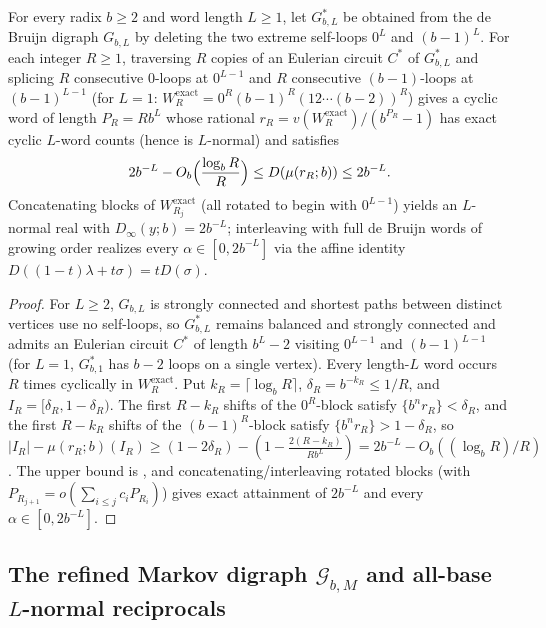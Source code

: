 \documentclass[11pt]{article}
\newcommand{\fr}[1]{\{#1\}}
\begin{document}
\begin{theorem}[Sharp ceiling $D_{\max}(b,L)=2b^{-L}$ and periodic-seed attainment]\label{thm:Dmax-attain}
For every radix $b\ge2$ and word length $L\ge1$, let $G_{b,L}^*$ be obtained from the de Bruijn digraph $G_{b,L}$ by deleting the two extreme self-loops $0^L$ and $(b-1)^L$. For each integer $R\ge1$, traversing $R$ copies of an Eulerian circuit $C^*$ of $G_{b,L}^*$ and splicing $R$ consecutive $0$-loops at $0^{L-1}$ and $R$ consecutive $(b-1)$-loops at $(b-1)^{L-1}$ (for $L=1$: $W_R^{\mathrm{exact}}=0^R(b-1)^R(12\cdots(b-2))^R$) gives a cyclic word of length $P_R=Rb^L$ whose rational $r_R=v(W_R^{\mathrm{exact}})/(b^{P_R}-1)$ has exact cyclic $L$-word counts (hence is $L$-normal) and satisfies
\[
2b^{-L}-O_b\Bigl(\frac{\log_b R}{R}\Bigr)\le D(\mu(r_R;b))\le 2b^{-L}.
\]
Concatenating blocks of $W_{R_j}^{\mathrm{exact}}$ (all rotated to begin with $0^{L-1}$) yields an $L$-normal real with $D_\infty(y;b)=2b^{-L}$; interleaving with full de Bruijn words of growing order realizes every $\alpha\in[0,2b^{-L}]$ via the affine identity $D((1-t)\lambda+t\sigma)=tD(\sigma)$.
\end{theorem}

\begin{proof}
For $L\ge2$, $G_{b,L}$ is strongly connected and shortest paths between distinct vertices use no self-loops, so $G_{b,L}^*$ remains balanced and strongly connected and admits an Eulerian circuit $C^*$ of length $b^L-2$ visiting $0^{L-1}$ and $(b-1)^{L-1}$ (for $L=1$, $G_{b,1}^*$ has $b-2$ loops on a single vertex). Every length-$L$ word occurs $R$ times cyclically in $W_R^{\mathrm{exact}}$. Put $k_R=\lceil\log_b R\rceil$, $\delta_R=b^{-k_R}\le 1/R$, and $I_R=[\delta_R,1-\delta_R)$. The first $R-k_R$ shifts of the $0^R$-block satisfy $\fr{b^n r_R}<\delta_R$, and the first $R-k_R$ shifts of the $(b-1)^R$-block satisfy $\fr{b^n r_R}>1-\delta_R$, so $|I_R|-\mu(r_R;b)(I_R)\ge(1-2\delta_R)-(1-\frac{2(R-k_R)}{Rb^L})=2b^{-L}-O_b((\log_b R)/R)$. The upper bound is , and concatenating/interleaving rotated blocks (with $P_{R_{j+1}}=o(\sum_{i\le j}c_i P_{R_i})$) gives exact attainment of $2b^{-L}$ and every $\alpha\in[0,2b^{-L}]$.
\end{proof}

\subsection{The refined Markov digraph $\mathcal G_{b,M}$ and all-base $L$-normal reciprocals}
\end{document}
